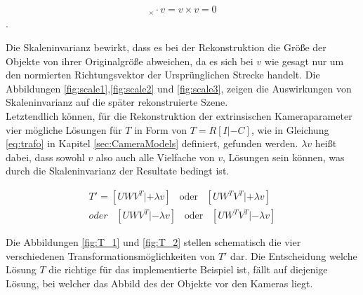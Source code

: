 
\begin{gather}
[C'_\delta]_\times \cdot v = v \times v = 0
\end{gather} 
.

Die Skaleninvarianz bewirkt, dass es bei der Rekonstruktion die Größe der Objekte von ihrer Originalgröße abweichen, da es sich bei $v$ wie gesagt nur um den normierten Richtungsvektor der Ursprünglichen Strecke handelt. Die Abbildungen \ref{fig:scale1},\ref{fig:scale2} und \ref{fig:scale3}, zeigen die Auswirkungen von Skaleninvarianz auf die später rekonstruierte Szene. \\

Letztendlich können, für die Rekonstruktion der extrinsischen Kameraparameter vier mögliche Lösungen für $T$ in Form von $T = R[I|-C]$, wie in Gleichung \ref{eq:trafo} in Kapitel \ref{sec:CameraModels} definiert, gefunden werden\cite{HZ,Ferid,phdextrinsicPara}. $\lambda v$ heißt dabei, dass sowohl $v$ also auch alle Vielfache von $v$, Lösungen sein können, was durch die Skaleninvarianz der Resultate bedingt ist\cite{HZ,Ferid,phdextrinsicPara}. 

\begin{gather}
T' = [UWV^T|+\lambda v] \;\;\; \text{oder} \;\;\;[UW^TV^T|+\lambda v]\\
\textit{oder}\;\;\; [UWV^T|-\lambda v] \;\;\; \text{oder} \;\;\;[UW^TV^T|-\lambda v]
\end{gather}

Die Abbildungen \ref{fig:T_1} und \ref{fig:T_2} stellen schematisch die vier verschiedenen Transformationsmöglichkeiten von $T'$ dar.  Die Entscheidung welche Lösung $T$ die richtige für das implementierte Beispiel ist, fällt auf diejenige Lösung, bei welcher das Abbild des der Objekte vor den Kameras liegt.\\\\


